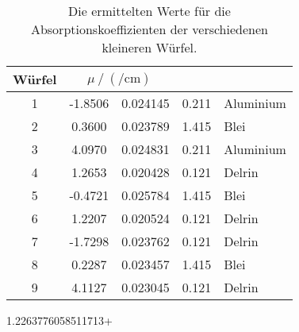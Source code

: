   \begin{table}[H]
    \centering
    \caption{Die ermittelten Werte für die Absorptionskoeffizienten der verschiedenen kleineren Würfel.}
    \label{tab:mu4}
    \begin{tabular}{c S[table-format=1.4] @{${}\pm{}$} S[table-format=1.6] }
      \toprule
      {Würfel} &   \\
       & -1.8506& 0.024145 & 0.211 & Aluminium \\
      2 & 0.3600 & 0.023789 & 1.415 & Blei \\
      3 & 4.0970 & 0.024831 & 0.211 & Aluminium \\
      4 & 1.2653 & 0.020428 & 0.121 & Delrin \\
      5 & -0.4721& 0.025784 & 1.415 & Blei \\
      6 & 1.2207 & 0.020524 & 0.121 & Delrin \\
      7 & -1.7298& 0.023762 & 0.121 & Delrin \\
      8 & 0.2287 & 0.023457 & 1.415 & Blei \\
      9 & 4.1127 & 0.023045 & 0.121 & Delrin \\
      \bottomrule
    \end{tabular}
  \end{table}1.2263776058511713+